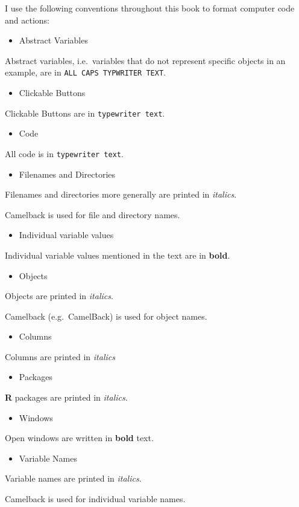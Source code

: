 I use the following conventions throughout this book to format computer
code and actions:

\begin{itemize}
\item
  Abstract Variables
\end{itemize}
Abstract variables, i.e.~variables that do not represent specific
objects in an example, are in \texttt{ALL CAPS TYPWRITER TEXT}.

\begin{itemize}
\item
  Clickable Buttons
\end{itemize}
Clickable Buttons are in \texttt{typewriter text}.

\begin{itemize}
\item
  Code
\end{itemize}
All code is in \texttt{typewriter text}.

\begin{itemize}
\item
  Filenames and Directories
\end{itemize}
Filenames and directories more generally are printed in \emph{italics}.

Camelback is used for file and directory names.

\begin{itemize}
\item
  Individual variable values
\end{itemize}
Individual variable values mentioned in the text are in \textbf{bold}.

\begin{itemize}
\item
  Objects
\end{itemize}
Objects are printed in \emph{italics}.

Camelback (e.g.~CamelBack) is used for object names.

\begin{itemize}
\item
  Columns
\end{itemize}
Columns are printed in \emph{italics}

\begin{itemize}
\item
  Packages
\end{itemize}
\textbf{R} packages are printed in \emph{italics}.

\begin{itemize}
\item
  Windows
\end{itemize}
Open windows are written in \textbf{bold} text.

\begin{itemize}
\item
  Variable Names
\end{itemize}
Variable names are printed in \emph{italics}.

Camelback is used for individual variable names.
